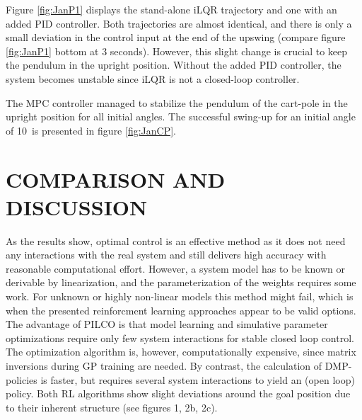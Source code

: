 \documentclass[letterpaper, 10 pt, conference]{ieeeconf}  %
\begin{document}
Figure \ref{fig:JanP1} displays the stand-alone iLQR trajectory and one with an added PID controller.
Both trajectories are almost identical, and there is only a small deviation in the control input at the end of the upswing (compare figure \ref{fig:JanP1} bottom at 3 seconds). However, this slight change is crucial to keep the pendulum in the upright position. Without the added PID controller, the system becomes unstable since iLQR is not a closed-loop controller.

The MPC controller managed to stabilize the pendulum of the cart-pole in the upright position for all initial angles. The successful swing-up for an initial angle of 10\textdegree \, is presented in figure \ref{fig:JanCP}. 



\section{COMPARISON AND DISCUSSION}
As the results show, optimal control is an effective method as it does not need any interactions with the real system and still delivers high accuracy with reasonable computational effort. However, a system model has to be known or derivable by linearization, and the parameterization of the weights requires some work.
For unknown or highly non-linear models this method might fail, which is when the presented reinforcment learning approaches appear to be valid options. The advantage of PILCO is that model learning and simulative parameter optimizations require only few system interactions for stable closed loop control. The optimization algorithm is, however, computationally expensive, since matrix inversions during GP training are needed. 
By contrast, the calculation of DMP-policies  is faster, but requires several system interactions to yield an (open loop) policy. Both RL algorithms show slight deviations around the goal position due to their inherent structure (see figures 1, 2b, 2c).
\end{document}
